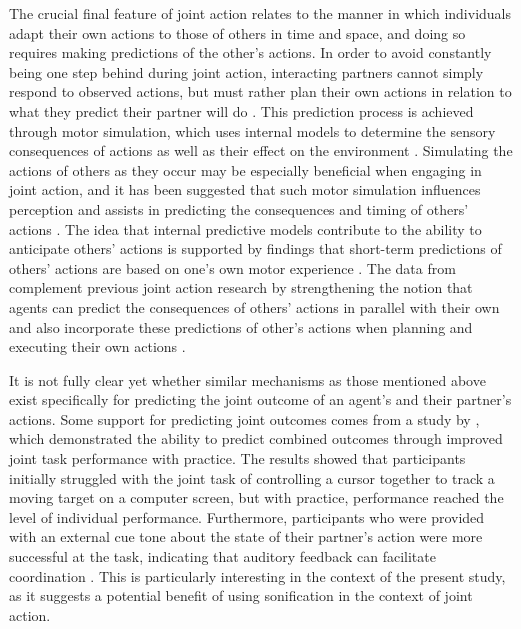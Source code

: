 \documentclass[10pt,a4paper,onecolumn]{article}
\begin{document}
The crucial final feature of joint action relates to the manner in which individuals adapt their own actions to those of others in time and space, and doing so requires making predictions of the other's actions. In order to avoid constantly being one step behind during joint action, interacting partners cannot simply respond to observed actions, but must rather plan their own actions in relation to what they predict their partner will do \autocite{sebanzJointActionBodies2006}. This prediction process is achieved through motor simulation, which uses internal models to determine the sensory consequences of actions as well as their effect on the environment \autocite{schmitzSoundJoinedActions2017,vesperMinimalArchitectureJoint2010}. Simulating the actions of others as they occur may be especially beneficial when engaging in joint action, and it has been suggested that such motor simulation influences perception and assists in predicting the consequences and timing of others' actions \autocite{vesperMinimalArchitectureJoint2010}. The idea that internal predictive models contribute to the ability to anticipate others' actions is supported by findings that short-term predictions of others' actions are based on one's own motor experience \autocite{agliotiActionAnticipationMotor2008,calvo-merinoActionObservationAcquired2005}. The data from \textcite{loehrSoundYouMe2016} complement previous joint action research by strengthening the notion that agents can predict the consequences of others' actions in parallel with their own \autocite{loehrMonitoringIndividualJoint2013,vandersteenADaptationAnticipationModel2013,vesperOurActionsMy2014,wolpertUnifyingComputationalFramework2003} and also incorporate these predictions of other's actions when planning and executing their own actions \autocite{knoblichActionCoordinationGroups2003,kourtisPredictiveRepresentationOther2012,loehrTemporalCoordinationPerforming2011,vesperAreYouReady2013}.

It is not fully clear yet whether similar mechanisms as those mentioned above exist specifically for predicting the joint outcome of an agent's and their partner's actions. Some support for predicting joint outcomes comes from a study by \textcite{knoblichActionCoordinationGroups2003}, which demonstrated the ability to predict combined outcomes through improved joint task performance with practice. The results showed that participants initially struggled with the joint task of controlling a cursor together to track a moving target on a computer screen, but with practice, performance reached the level of individual performance. Furthermore, participants who were provided with an external cue tone about the state of their partner's action were more successful at the task, indicating that auditory feedback can facilitate coordination \autocite{knoblichActionCoordinationGroups2003}. This is particularly interesting in the context of the present study, as it suggests a potential benefit of using sonification in the context of joint action.
\end{document}
